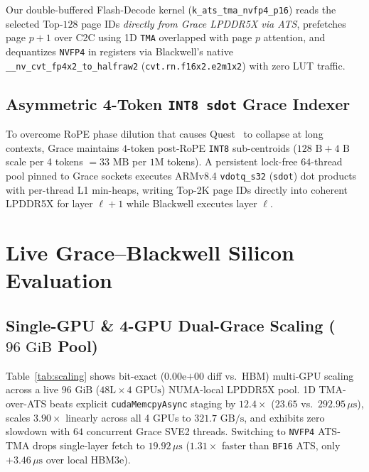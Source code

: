 \documentclass[conference,10pt]{IEEEtran}
\begin{document}
Our double-buffered Flash-Decode kernel (\texttt{k\_ats\_tma\_nvfp4\_p16}) reads the selected Top-$128$ page IDs \emph{directly from Grace LPDDR5X via ATS}, prefetches page $p{+}1$ over C2C using 1D \texttt{TMA} overlapped with page $p$ attention, and dequantizes \texttt{NVFP4} in registers via Blackwell's native \texttt{\_\_nv\_cvt\_fp4x2\_to\_halfraw2} (\texttt{cvt.rn.f16x2.e2m1x2}) with zero LUT traffic.

\subsection{Asymmetric 4-Token \texttt{INT8 sdot} Grace Indexer}
To overcome RoPE phase dilution that causes Quest~\cite{tang2024quest} to collapse at long contexts, Grace maintains $4$-token post-RoPE \texttt{INT8} sub-centroids ($128\text{ B} + 4\text{ B}$ scale per 4 tokens $= 33\text{ MB}$ per $1\text{M}$ tokens). A persistent lock-free $64$-thread pool pinned to Grace sockets executes ARMv8.4 \texttt{vdotq\_s32} (\texttt{sdot}) dot products with per-thread L1 min-heaps, writing Top-2K page IDs directly into coherent LPDDR5X for layer $\ell{+}1$ while Blackwell executes layer $\ell$.

\section{Live Grace--Blackwell Silicon Evaluation}

\subsection{Single-GPU \& 4-GPU Dual-Grace Scaling ($96\text{ GiB}$ Pool)}
Table~\ref{tab:scaling} shows bit-exact ($0.00\text{e+00}$ diff vs.\ HBM) multi-GPU scaling across a live $96\text{ GiB}$ ($48\text{L} \times 4\text{ GPUs}$) NUMA-local LPDDR5X pool. 1D TMA-over-ATS beats explicit \texttt{cudaMemcpyAsync} staging by \textbf{$12.4\times$} ($23.65$ vs.\ $292.95\,\mu\text{s}$), scales $3.90\times$ linearly across all 4 GPUs to \textbf{$321.7\text{ GB/s}$}, and exhibits zero slowdown with $64$ concurrent Grace SVE2 threads. Switching to \texttt{NVFP4} ATS-TMA drops single-layer fetch to \textbf{$19.92\,\mu\text{s}$} ($1.31\times$ faster than \texttt{BF16} ATS, only $+3.46\,\mu\text{s}$ over local HBM3e).
\end{document}
